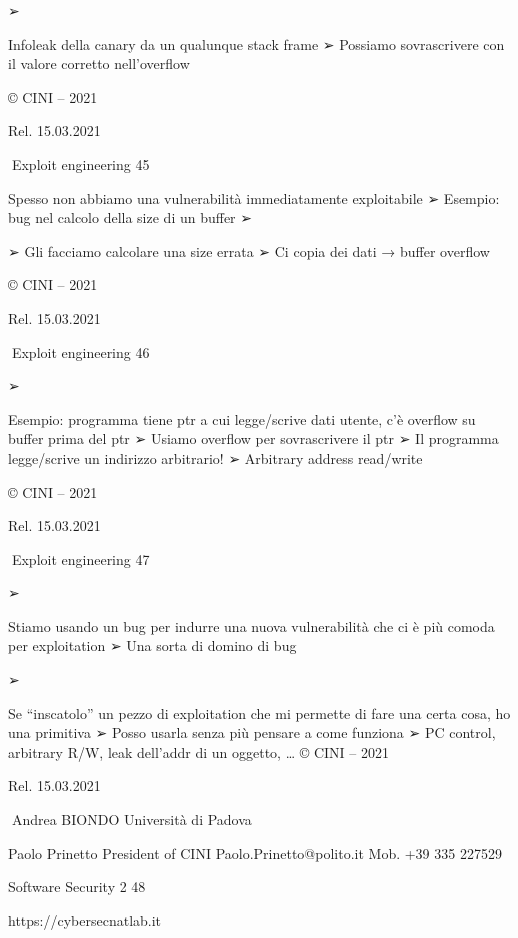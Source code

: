 \documentclass[11pt,a4paper]{article}
\begin{document}
➢

Infoleak della canary da un qualunque stack frame ➢ Possiamo
sovrascrivere con il valore corretto nell'overflow

© CINI -- 2021

Rel. 15.03.2021

Exploit engineering 45

Spesso non abbiamo una vulnerabilità immediatamente exploitabile ➢
Esempio: bug nel calcolo della size di un buffer ➢

➢ Gli facciamo calcolare una size errata ➢ Ci copia dei dati → buffer
overflow

© CINI -- 2021

Rel. 15.03.2021

Exploit engineering 46

➢

Esempio: programma tiene ptr a cui legge/scrive dati utente, c'è
overflow su buffer prima del ptr ➢ Usiamo overflow per sovrascrivere il
ptr ➢ Il programma legge/scrive un indirizzo arbitrario! ➢ Arbitrary
address read/write

© CINI -- 2021

Rel. 15.03.2021

Exploit engineering 47

➢

Stiamo usando un bug per indurre una nuova vulnerabilità che ci è più
comoda per exploitation ➢ Una sorta di domino di bug

➢

Se ``inscatolo'' un pezzo di exploitation che mi permette di fare una
certa cosa, ho una primitiva ➢ Posso usarla senza più pensare a come
funziona ➢ PC control, arbitrary R/W, leak dell'addr di un oggetto,
\ldots{} © CINI -- 2021

Rel. 15.03.2021

Andrea BIONDO Università di Padova

Paolo Prinetto President of CINI Paolo.Prinetto@polito.it Mob. +39 335
227529

Software Security 2 48

https://cybersecnatlab.it


\end{document}
